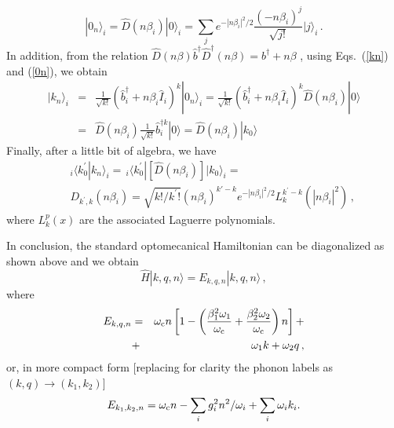 \documentclass[aps,pra,twocolumn,floatfix,longbibliography, superscriptaddress]{revtex4-1}
\newcommand{\ket}[1]{|#1\rangle}
\newcommand{\nn}{\nonumber}
\newcommand{\be}{\begin{equation}}
\newcommand{\ee}{\end{equation}}
\newcommand{\bea}{\begin{eqnarray}}
\newcommand{\eea}{\end{eqnarray}}
\begin{document}
\be \label{0n}
|0_n\rangle_i=\hat D(n \beta_i)|0\rangle_i=\sum_j e^{-|n\beta_i|^2/2}\frac{(-n\beta_i)^j}{\sqrt{j!}}\ket{j}_i\, .\ee
In addition,  from the relation $\hat D(n \beta)\hat b^\dag \hat D^\dag(n \beta)= b^\dag +n \beta $ \cite{Scully1997}, using Eqs.~(\ref{kn}) and (\ref{0n}), we obtain
\bea
| k_n \rangle_i &=& \nn
\frac{1}{\sqrt {k!}}(\hat b^\dag_i +n\beta_i \hat I_i)^k |0_n\rangle_i =\frac{1}{\sqrt {k!}}(\hat b^\dag_i +n\beta_i \hat I_i)^k\hat D(n \beta_i)|0\rangle\\ &=&\hat D(n \beta_i)\frac{1}{\sqrt {k!}}\hat b^{\dag k}_i|0\rangle=\hat D(n \beta_i)|k_0\rangle
\eea
Finally, after a little bit of algebra, we have
\bea
&&_{i}\langle k^\prime_0| k_n^{} \rangle_i=\,
_{i}\langle k^\prime_0|[\hat D(n\beta_i)]|k_0\rangle_i=\\ \nn
&&D_{k^\prime,k}(n\beta_i)=
\sqrt{k!/k^\prime!} (n\beta_i)^{k'-k} e^{-|n\beta_i|^2/2} L_k^{k^\prime-k}(|n\beta_i|^2)\, ,
\eea
where $L_k^{p}(x)$ are the associated Laguerre polynomials.

In conclusion, the standard optomecanical Hamiltonian can be diagonalized as shown above and we obtain
\be
\hat H \ket{k,q,n}=E_{k,q,n}\ket{k,q,n}\, ,
\ee
where
\bea
E_{k,q,n}&=& \omega_{\rm c}n \nn \left[1-\left(\frac{\beta_1^2\omega_1}{\omega_{\rm c}}+
\frac{\beta_2^2\omega_2}{\omega_{\rm c}}\right)
n\right]+ \\ &+&
\omega_{1} k + \omega_{2} q\, ,
\eea
or, in more compact form [replacing for clarity the phonon labels as $(k,q)\rightarrow (k_1,k_2) $]
\be
E_{k_1,k_2,n} = \omega_{\rm c} n - \sum_i g_i^2 n^2 / \omega_{ i} + \sum_i \omega_{i} k_i.
\ee
\end{document}
